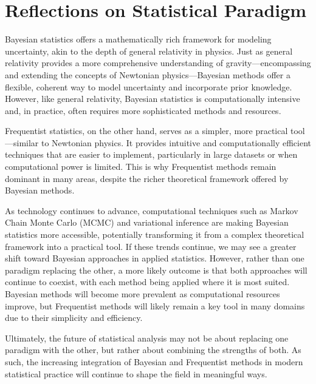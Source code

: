 \chapter{Reflections on Statistical Paradigm}
Bayesian statistics offers a mathematically rich framework for modeling uncertainty, akin to the depth of general relativity in physics. Just as general relativity provides a more comprehensive understanding of gravity—encompassing and extending the concepts of Newtonian physics—Bayesian methods offer a flexible, coherent way to model uncertainty and incorporate prior knowledge. However, like general relativity, Bayesian statistics is computationally intensive and, in practice, often requires more sophisticated methods and resources.

Frequentist statistics, on the other hand, serves as a simpler, more practical tool—similar to Newtonian physics. It provides intuitive and computationally efficient techniques that are easier to implement, particularly in large datasets or when computational power is limited. This is why Frequentist methods remain dominant in many areas, despite the richer theoretical framework offered by Bayesian methods.

As technology continues to advance, computational techniques such as Markov Chain Monte Carlo (MCMC) and variational inference are making Bayesian statistics more accessible, potentially transforming it from a complex theoretical framework into a practical tool. If these trends continue, we may see a greater shift toward Bayesian approaches in applied statistics. However, rather than one paradigm replacing the other, a more likely outcome is that both approaches will continue to coexist, with each method being applied where it is most suited. Bayesian methods will become more prevalent as computational resources improve, but Frequentist methods will likely remain a key tool in many domains due to their simplicity and efficiency.

Ultimately, the future of statistical analysis may not be about replacing one paradigm with the other, but rather about combining the strengths of both. As such, the increasing integration of Bayesian and Frequentist methods in modern statistical practice will continue to shape the field in meaningful ways.